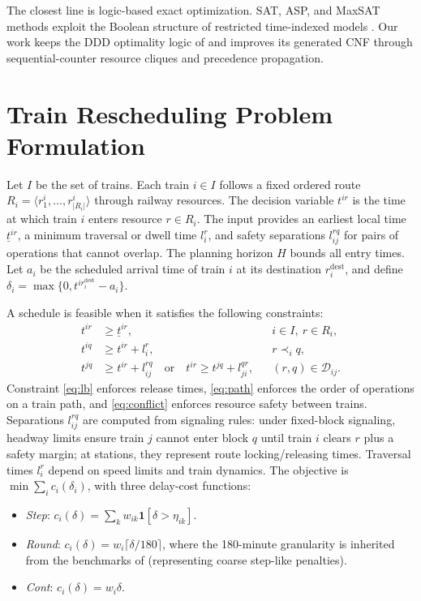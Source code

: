 \documentclass[runningheads]{llncs}
\begin{document}
The closest line is logic-based exact optimization. SAT, ASP, and MaxSAT
methods exploit the Boolean structure of restricted time-indexed models
\cite{Matos2021,Abels2021,LeutwilerCorman2022}. Our work keeps the DDD
optimality logic of \cite{Croella2024} and improves its generated CNF through
sequential-counter resource cliques and precedence propagation.

\section{Train Rescheduling Problem Formulation}

Let $I$ be the set of trains. Each train $i\in I$ follows a fixed ordered route
$R_i=\langle r^i_1,\ldots,r^i_{|R_i|}\rangle$ through railway resources. The
decision variable $t^{ir}$ is the time at which train $i$ enters resource
$r\in R_i$. The input provides an earliest local time $\underline t^{ir}$, a
minimum traversal or dwell time $l_i^r$, and safety separations
$l_{ij}^{rq}$ for pairs of operations that cannot overlap. The planning horizon
$H$ bounds all entry times. Let $a_i$ be the scheduled arrival time of train $i$
at its destination $r_i^{\mathrm{dest}}$, and define
$\delta_i=\max\{0,t^{i r_i^{\mathrm{dest}}}-a_i\}$.

A schedule is feasible when it satisfies the following constraints:
\begin{align}
t^{ir} &\ge \underline t^{ir},
&& i\in I,\ r\in R_i, \label{eq:lb}\\
t^{iq} &\ge t^{ir}+l_i^r,
&& r \prec_i q, \label{eq:path}\\
t^{jq} &\ge t^{ir}+l_{ij}^{rq}
\quad \text{or}\quad
t^{ir}\ge t^{jq}+l_{ji}^{qr},
&& (r,q)\in\mathcal D_{ij}. \label{eq:conflict}
\end{align}
Constraint \eqref{eq:lb} enforces release times, \eqref{eq:path} enforces the
order of operations on a train path, and \eqref{eq:conflict} enforces resource
safety between trains. Separations $l_{ij}^{rq}$ are computed from signaling rules: under fixed-block signaling, headway limits ensure train $j$ cannot enter block $q$ until train $i$ clears $r$ plus a safety margin; at stations, they represent route locking/releasing times. Traversal times $l_i^r$ depend on speed limits and train dynamics. The objective is $\min \sum_i c_i(\delta_i)$, with three delay-cost functions:
\begin{itemize}
\item \emph{Step}: $c_i(\delta)=\sum_k w_{ik}\mathbf 1[\delta>\eta_{ik}]$.
\item \emph{Round}: $c_i(\delta)=w_i\lceil\delta/180\rceil$, where the 180-minute granularity is inherited from the benchmarks of \cite{Croella2024} (representing coarse step-like penalties).
\item \emph{Cont}: $c_i(\delta)=w_i\delta$.
\end{itemize}
\end{document}
